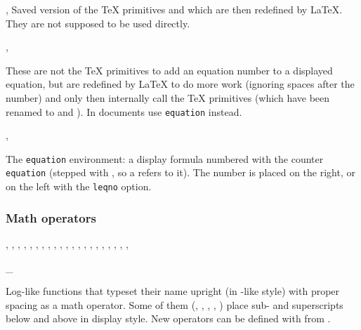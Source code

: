\documentclass{l3in2edoc}
\begin{document}
\begin{function}[int]
  {
    \@kernel@eqno,
    \@kernel@leqno
  }
  Saved version of the \TeX{} primitives  and 
  which are then redefined by \LaTeX{}. They are not supposed to be
  used directly.
\end{function}


\begin{function}[]
  {
    \eqno,
    \leqno
  }
  \begin{syntax}
     
  \end{syntax}
  These are not the \TeX{} primitives to add an equation number to a
  displayed equation, but are redefined by \LaTeX{} to do more work
  (ignoring spaces after the number) and only then internally call the
  \TeX{} primitives (which have been renamed to  and
  ). In documents use \texttt{equation} instead.
\end{function}


\begin{function}[user]
  {
    \equation,
    \endequation
  }
  \begin{syntax}
      
  \end{syntax}
  The \texttt{equation} environment: a display formula numbered with
  the counter \texttt{equation} (stepped with , so
  a  refers to it). The number is placed on the right, or on
  the left with the \texttt{leqno} option.
\end{function}



\subsubsection{Math operators}

\begin{function}[user]
  {
    \cos,
    \sin,
    \tan,
    \cosh,
    \sinh,
    \tanh,
    \cot,
    \coth,
    \arccos,
    \arcsin,
    \arctan,
    \log,
    \lg,
    \ln,
    \lim,
    \limsup,
    \liminf,
    \sec,
    \csc,
    \max,
    \min,
  }
  \begin{syntax}
    \_
  \end{syntax}
  Log-like functions that typeset their name upright (in
  -like style) with proper spacing as a math operator. Some
  of them (, , , , )
  place sub- and superscripts below and above in display style. New
  operators can be defined with  from
  .
\end{function}
\end{document}
